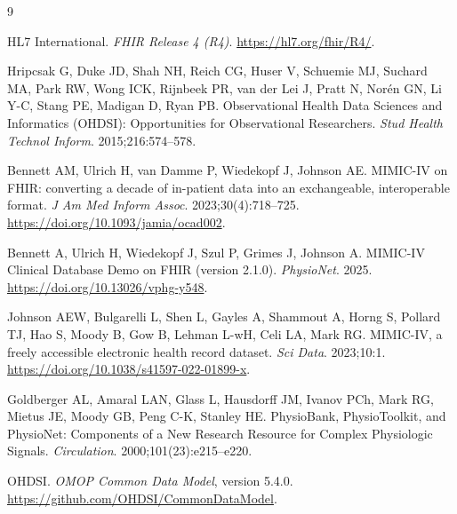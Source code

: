 \documentclass[11pt]{article}
\begin{document}

\begin{thebibliography}{9}

HL7 International.
\emph{FHIR Release 4 (R4)}.
\url{https://hl7.org/fhir/R4/}.

Hripcsak G, Duke JD, Shah NH, Reich CG, Huser V, Schuemie MJ, Suchard MA,
Park RW, Wong ICK, Rijnbeek PR, van der Lei J, Pratt N, Norén GN, Li Y-C,
Stang PE, Madigan D, Ryan PB.
Observational Health Data Sciences and Informatics (OHDSI): Opportunities
for Observational Researchers.
\emph{Stud Health Technol Inform}. 2015;216:574--578.

Bennett AM, Ulrich H, van Damme P, Wiedekopf J, Johnson AE.
MIMIC-IV on FHIR: converting a decade of in-patient data into an
exchangeable, interoperable format.
\emph{J Am Med Inform Assoc}. 2023;30(4):718--725.
\url{https://doi.org/10.1093/jamia/ocad002}.

Bennett A, Ulrich H, Wiedekopf J, Szul P, Grimes J, Johnson A.
MIMIC-IV Clinical Database Demo on FHIR (version 2.1.0).
\emph{PhysioNet}. 2025.
\url{https://doi.org/10.13026/vphg-y548}.

Johnson AEW, Bulgarelli L, Shen L, Gayles A, Shammout A, Horng S,
Pollard TJ, Hao S, Moody B, Gow B, Lehman L-wH, Celi LA, Mark RG.
MIMIC-IV, a freely accessible electronic health record dataset.
\emph{Sci Data}. 2023;10:1.
\url{https://doi.org/10.1038/s41597-022-01899-x}.

Goldberger AL, Amaral LAN, Glass L, Hausdorff JM, Ivanov PCh, Mark RG,
Mietus JE, Moody GB, Peng C-K, Stanley HE.
PhysioBank, PhysioToolkit, and PhysioNet: Components of a New Research
Resource for Complex Physiologic Signals.
\emph{Circulation}. 2000;101(23):e215--e220.

OHDSI.
\emph{OMOP Common Data Model}, version 5.4.0.
\url{https://github.com/OHDSI/CommonDataModel}.

\end{thebibliography}
\end{document}
